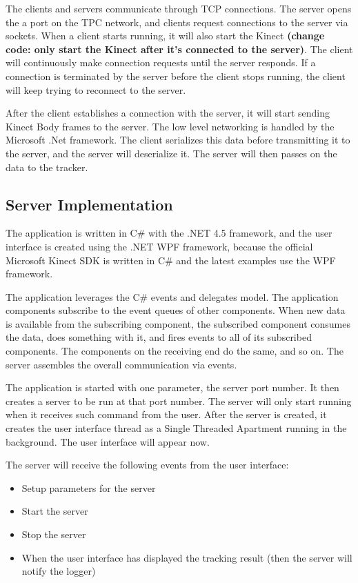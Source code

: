 The clients and servers communicate through TCP connections. The server opens the a port on the TPC network, and clients request connections to the server via sockets. When a client starts running, it will also start the Kinect \textbf{(change code: only start the Kinect after it's connected to the server)}. The client will continuously make connection requests until the server responds. If a connection is terminated by the server before the client stops running, the client will keep trying to reconnect to the server.

After the client establishes a connection with the server, it will start sending Kinect Body frames to the server. The low level networking is handled by the Microsoft .Net framework. The client serializes this data before transmitting it to the server, and the server will deserialize it. The server will then passes on the data to the tracker.

\subsection{Server Implementation}

The application is written in C\# with the .NET 4.5 framework, and the user interface is created using the .NET WPF framework, because the official Microsoft Kinect SDK is written in C\# and the latest examples use the WPF framework. 

The application leverages the C\# events and delegates model. The application components subscribe to the event queues of other components. When new data is available from the subscribing component, the subscribed component consumes the data, does something with it, and fires events to all of its subscribed components. The components on the receiving end do the same, and so on. The server assembles the overall communication via events.

The application is started with one parameter, the server port number. It then creates a server to be run at that port number. The server will only start running when it receives such command from the user. After the server is created, it creates the user interface thread as a Single Threaded Apartment running in the background. The user interface will appear now.

The server will receive the following events from the user interface:

\begin{itemize}
  \item Setup parameters for the server
  \item Start the server
  \item Stop the server
  \item When the user interface has displayed the tracking result (then the server will notify the logger)
\end{itemize}

